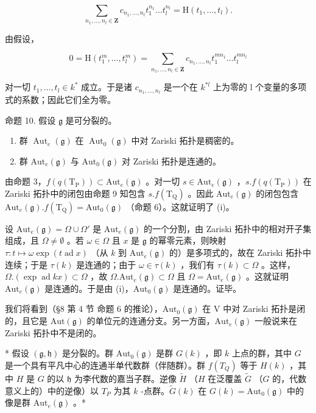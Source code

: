 \[
\sum_ {n _ {1}, \dots , n _ {l} \in \mathbf {Z}} c _ {n _ {1}, \dots , n _ {l}} t _ {1} ^ {n _ {1}} \dots t _ {l} ^ {n _ {l}} = \mathrm{H} (t _ {1}, \dots , t _ {l}).
\]

由假设，

\[
0 = \mathrm{H} (t _ {1} ^ {m}, \dots , t _ {l} ^ {m}) = \sum_ {n _ {1}, \dots , n _ {l} \in \mathbf {Z}} c _ {n _ {1}, \dots , n _ {l}} t _ {1} ^ {m n _ {1}} \dots t _ {l} ^ {m n _ {l}}
\]

对一切 \(t_{1},\ldots,t_{l}\in k^{*}\) 成立。于是诸 \(c_{n_{1},\ldots,n_{l}}\) 是一个在 \(k^{*l}\) 上为零的 l 个变量的多项式的系数；因此它们全为零。

命题 10. 假设 \(\mathfrak{g}\) 是可分裂的。

\begin{enumerate}
\def\labelenumi{(\roman{enumi})}
\item
  群 \(\operatorname{Aut}_{e}(\mathfrak{g})\) 在 \(\operatorname{Aut}_{0}(\mathfrak{g})\) 中对 Zariski 拓扑是稠密的。
\item
  群 \(\mathrm{Aut}_e(\mathfrak{g})\) 与 \(\mathrm{Aut}_0(\mathfrak{g})\) 对 Zariski 拓扑是连通的。
\end{enumerate}

由命题 3，\(f(q(\mathrm{T}_{\mathrm{P}})) \subset \mathrm{Aut}_e(\mathfrak{g})\) 。对一切 \(s \in \mathrm{Aut}_e(\mathfrak{g})\) ，\(s.f(q(\mathrm{T}_{\mathrm{P}}))\) 在 Zariski 拓扑中的闭包由命题 9 知包含 \(s.f(\mathrm{T}_{\mathrm{Q}})\) 。因此 \(\mathrm{Aut}_e(\mathfrak{g})\) 的闭包包含 \(\mathrm{Aut}_e(\mathfrak{g}).f(\mathrm{T}_{\mathrm{Q}}) = \mathrm{Aut}_0(\mathfrak{g})\) （命题 6）。这就证明了 (i)。

设 \(\mathrm{Aut}_e(\mathfrak{g}) = \Omega \cup \Omega'\) 是 \(\mathrm{Aut}_e(\mathfrak{g})\) 的一个分割，由 Zariski 拓扑中的相对开子集组成，且 \(\Omega \neq \emptyset\) 。若 \(\omega \in \Omega\) 且 \(x\) 是 \(\mathfrak{g}\) 的幂零元素，则映射 \(\tau : t \mapsto \omega \exp(t \operatorname{ad} x)\) （从 \(k\) 到 \(\mathrm{Aut}_e(\mathfrak{g})\) 的）是多项式的，故在 Zariski 拓扑中连续；于是 \(\tau(k)\) 是连通的；由于 \(\omega \in \tau(k)\) ，我们有 \(\tau(k) \subset \Omega\) 。这样，\(\Omega. (\exp \operatorname{ad} kx) \subset \Omega\) ，故 \(\Omega. \mathrm{Aut}_e(\mathfrak{g}) \subset \Omega\) 且 \(\Omega = \mathrm{Aut}_e(\mathfrak{g})\) 。这就证明 \(\mathrm{Aut}_e(\mathfrak{g})\) 是连通的。于是由 (i)，\(\mathrm{Aut}_0(\mathfrak{g})\) 是连通的。证毕。

我们将看到（§8 第 4 节 命题 6 的推论），\(\mathrm{Aut}_0(\mathfrak{g})\) 在 V 中对 Zariski 拓扑是闭的，且它是 \(\mathrm{Aut}(\mathfrak{g})\) 的单位元的连通分支。另一方面，\(\mathrm{Aut}_e(\mathfrak{g})\) 一般说来在 Zariski 拓扑中不是闭的。

* 假设 \((\mathfrak{g},\mathfrak{h})\) 是分裂的。群 \(\mathrm{Aut}_0(\mathfrak{g})\) 是群 \(G(k)\) ，即 \(k\) 上点的群，其中 \(G\) 是一个具有平凡中心的连通半单代数群（伴随群）。群 \(f(T_{Q})\) 等于 \(H(k)\) ，其中 \(H\) 是 \(G\) 的以 \(\mathfrak{h}\) 为李代数的嘉当子群。逆像 \(\tilde{H}\) （\(H\) 在泛覆盖 \(\tilde{G}\) （\(G\) 的，代数意义上的）中的逆像）以 \(T_{P}\) 为其 \(k\) -点群。\(\tilde{G}(k)\) 在 \(G(k) = \mathrm{Aut}_0(\mathfrak{g})\) 中的像是群 \(\mathrm{Aut}_e(\mathfrak{g})\) 。*

